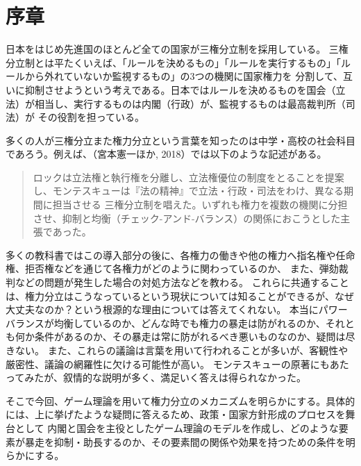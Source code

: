 \documentclass[main.tex]{subfiles}
\begin{document}
\section*{序章}
\setcounter{page}{1}

日本をはじめ先進国のほとんど全ての国家が三権分立制を採用している。
三権分立制とは平たくいえば、「ルールを決めるもの」「ルールを実行するもの」「ルールから外れていないか監視するもの」の3つの機関に国家権力を
分割して、互いに抑制させようという考えである。日本ではルールを決めるものを国会（立法）が相当し、実行するものは内閣（行政）が、監視するものは最高裁判所（司法）が
その役割を担っている。

多くの人が三権分立また権力分立という言葉を知ったのは中学・高校の社会科目であろう。例えば、（宮本憲一ほか, 2018）では以下のような記述がある。
\begin{quote}
  ロックは立法権と執行権を分離し、立法権優位の制度をとることを提案し、モンテスキューは『法の精神』で立法・行政・司法をわけ、異なる期間に担当させる
  三権分立制を唱えた。いずれも権力を複数の機関に分担させ、抑制と均衡（チェック-アンド-バランス）の関係におこうとした主張であった。
\end{quote}
多くの教科書ではこの導入部分の後に、各権力の働きや他の権力へ指名権や任命権、拒否権などを通じて各権力がどのように関わっているのか、
また、弾劾裁判などの問題が発生した場合の対処方法などを教わる。
これらに共通することは、権力分立はこうなっているという現状については知ることができるが、なぜ大丈夫なのか？という根源的な理由については答えてくれない。
本当にパワーバランスが均衡しているのか、どんな時でも権力の暴走は防がれるのか、それとも何か条件があるのか、その暴走は常に防がれるべき悪いものなのか、疑問は尽きない。
また、これらの議論は言葉を用いて行われることが多いが、客観性や厳密性、議論の網羅性に欠ける可能性が高い。
モンテスキューの原著にもあたってみたが、叙情的な説明が多く、満足いく答えは得られなかった。

そこで今回、ゲーム理論を用いて権力分立のメカニズムを明らかにする。具体的には、上に挙げたような疑問に答えるため、政策・国家方針形成のプロセスを舞台として
内閣と国会を主役としたゲーム理論のモデルを作成し、どのような要素が暴走を抑制・助長するのか、その要素間の関係や効果を持つための条件を明らかにする。
\end{document}
